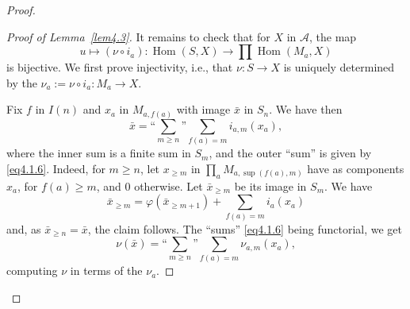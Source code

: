 \documentclass[11pt,a4paper]{article}
\theoremstyle{plain}
\theoremstyle{definition}
\DeclareMathOperator{\Hom}{Hom}
\numberwithin{equation}{section}
\begin{document}
\begin{proof}
\begin{proof}[Proof of Lemma~\ref{lem4.3}]
It remains to check that for $X$ in $\mathcal{A}$, the map
\begin{equation}\label{eq4.3.3}
u \longmapsto (\nu \circ i_{a}): \Hom(S,X) \to \prod \Hom(M_{a},X)
\end{equation}
is bijective. We first prove injectivity, i.e., that $\nu: S \to X$ is uniquely determined by the $\nu_{a} := \nu \circ i_{a}: M_{a} \to X$.

Fix $f$ in $I(n)$ and $x_{a}$ in $M_{a,f(a)}$ with image $\bar{x}$ in $S_{n}$. We have then
\begin{equation}\label{eq4.3.4}
\bar{x} = \text{``}\sum_{m\geq n}\text{''} \sum_{f(a)=m} i_{a,m}(x_{a}),
\end{equation}
where the inner sum is a finite sum in $S_{m}$, and the outer ``sum'' is given by \eqref{eq4.1.6}. Indeed, for $m \geq n$, let $x_{\geq m}$ in $\prod_{a} M_{a,\sup(f(a),m)}$ have as components $x_{a}$, for $f(a) \geq m$, and $0$ otherwise. Let $\bar{x}_{\geq m}$ be its image in $S_{m}$. We have
\begin{equation*}
\bar{x}_{\geq m} = \varphi(\bar{x}_{\geq m+1}) + \sum_{f(a)=m} i_{a}(x_{a})
\end{equation*}
and, as $\bar{x}_{\geq n} = \bar{x}$, the claim follows. The ``sums'' \eqref{eq4.1.6} being functorial, we get
\begin{equation}\label{eq4.3.4bis}
\nu(\bar{x}) = \text{``}\sum_{m\geq n}\text{''} \sum_{f(a)=m} \nu_{a,m}(x_{a}),
\end{equation}
computing $\nu$ in terms of the $\nu_{a}$.


\end{proof}
\end{proof}
\end{document}
